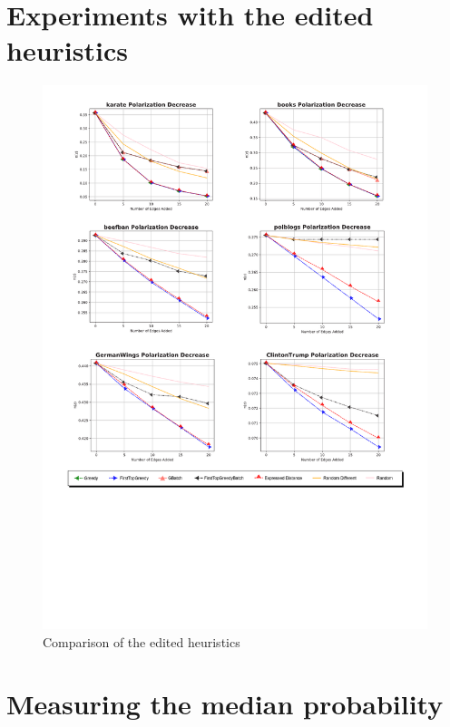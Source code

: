 \clearpage


\section{Experiments with the edited heuristics}		
\label{sec:experimentsProbs}

\begin{figure}[!htbp]
	\begin{center}
	\advance\leftskip-1.3cm
	\captionsetup{justification=centering,margin=2cm}
	\includegraphics[width=1.2\textwidth]{Figures/probs}
	\caption{Comparison of the edited heuristics}
	\end{center}
	\label{probs_heur}
\end{figure}

\clearpage

\section{Measuring the median probability}		
\label{sec:median}

